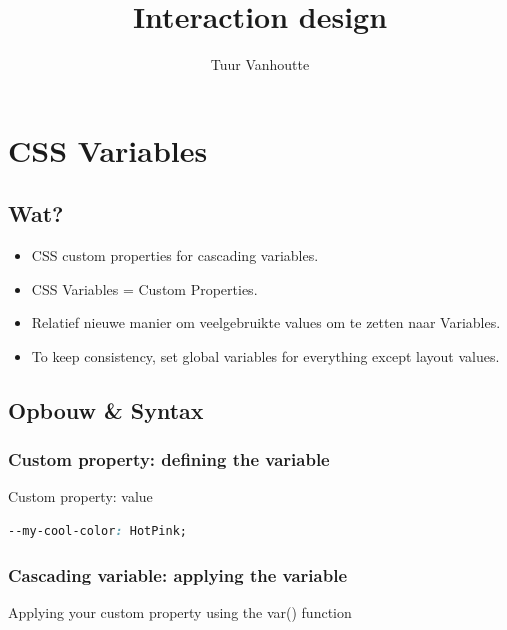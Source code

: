 \documentclass{article}
\begin{document}
\begin{titlepage}
    \author{Tuur Vanhoutte}
    \title{Interaction design}
\end{titlepage}

\maketitle
\newpage
\tableofcontents
\newpage


\section{CSS Variables}

\subsection{Wat?}

\begin{itemize}
    \item CSS custom properties for cascading variables.
    \item CSS Variables = Custom Properties.
    \item Relatief nieuwe manier om veelgebruikte values om te zetten naar Variables.
    \item To keep consistency, set global variables for everything except layout values.
\end{itemize}

\subsection{Opbouw \& Syntax}

\subsubsection{Custom property: defining the variable}
Custom property: value

\begin{lstlisting}[language=CSS]
--my-cool-color: HotPink;
\end{lstlisting}

\subsubsection{Cascading variable: applying the variable}

Applying your custom property using the var() function
\end{document}
